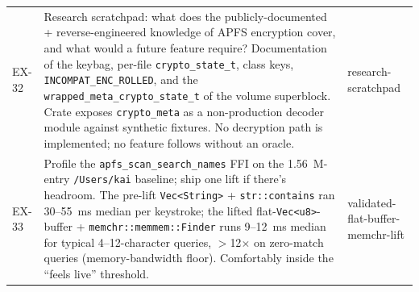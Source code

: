 \begin{longtable}{p{}p{}p{}}
EX-32 &
Research scratchpad: what does the publicly-documented +
reverse-engineered knowledge of APFS encryption cover, and
what would a future feature require? Documentation of the
keybag, per-file \texttt{crypto\_state\_t}, class keys,
\texttt{INCOMPAT\_ENC\_ROLLED}, and the
\texttt{wrapped\_meta\_crypto\_state\_t} of the volume
superblock. Crate exposes \texttt{crypto\_meta} as a
non-production decoder module against synthetic fixtures.
No decryption path is implemented; no feature follows without
an oracle.
& research-scratchpad \\

EX-33 &
Profile the \texttt{apfs\_scan\_search\_names} FFI on the
1.56~M-entry \texttt{/Users/kai} baseline; ship one lift if
there's headroom. The pre-lift \texttt{Vec<String>} +
\texttt{str::contains} ran 30--55~ms median per keystroke;
the lifted flat-\texttt{Vec<u8>}-buffer +
\texttt{memchr::memmem::Finder} runs 9--12~ms median for
typical 4--12-character queries, $>$12$\times$ on zero-match
queries (memory-bandwidth floor). Comfortably inside the
``feels live'' threshold.
& validated-flat-buffer-memchr-lift \\

\end{longtable}
